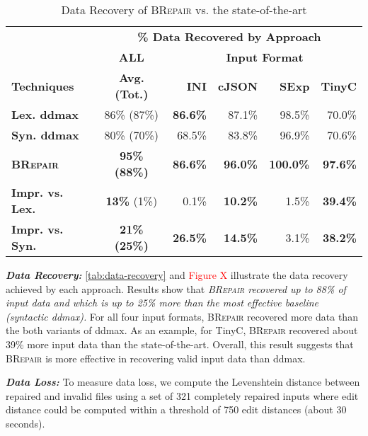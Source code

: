 \documentclass[sigconf,review,anonymous]{acmart}
\newcommand{\recheck}[1]{\textcolor{red}{#1}}
\newcommand{\approach}{\textsc{BRepair}\xspace}
\begin{document}
\begin{table}[!tbp]\centering
\caption{Data Recovery of \approach vs. the state-of-the-art}
\begin{tabular}{|l | c | r  r  r  r |}
\hline
&  \multicolumn{5}{c|}{\textbf{\% Data Recovered by Approach}}  \\
&  \multicolumn{1}{c|}{\textbf{ALL}} & \multicolumn{4}{c|}{\textbf{Input Format}}  \\
\textbf{Techniques} & \textbf{Avg. (Tot.)} & \textbf{INI} & \textbf{cJSON} & \textbf{SExp} & \textbf{TinyC} \\
\hline
\textbf{Lex. ddmax} & 86\% (87\%) & \textbf{86.6\%} & 87.1\%	 & 98.5\%	& 70.0\% \\			
\textbf{Syn. ddmax} & 80\% (70\%) & 68.5\% & 83.8\%  & 96.9\%	& 70.6\% \\	
\hline 
\textbf{\approach} & \textbf{ 95\% (88\%)} & \textbf{86.6\%} & \textbf{96.0\%} & \textbf{100.0\%}	& \textbf{97.6\%} \\
\hline
\textbf{Impr. vs. Lex.} & \textbf{13\%} (1\%) & 0.1\%	& \textbf{10.2\%}	& 1.5\%	& \textbf{39.4\%} \\
\textbf{Impr. vs. Syn.} & \textbf{21\% (25\%)} & \textbf{26.5\%} 	& \textbf{14.5\%}	& 3.1\%	& \textbf{38.2\% }\\
\hline
\end{tabular}
\label{tab:data-recovery}
\end{table}

\noindent
\textbf{\textit{Data Recovery:}} \autoref{tab:data-recovery} and \recheck{Figure X} illustrate the data %
recovery achieved by each approach. %
Results show that \textit{\approach recovered up to 88\% of input data and which is up to 25\% more than the most effective baseline (syntactic ddmax).} %
For all four input formats, \approach recovered more data than the both variants of ddmax. As an example, for TinyC, \approach recovered about 39\% more input data than the state-of-the-art. 
Overall, this result suggests that \approach is more effective in recovering valid input data than ddmax. 

\noindent
\textbf{\textit{Data Loss:}} To measure data loss, we compute the Levenshtein distance between repaired and invalid files using %
a set of 321 completely repaired inputs %
where edit distance could be computed within a threshold of 750 edit distances (about 30 seconds). 
\end{document}
